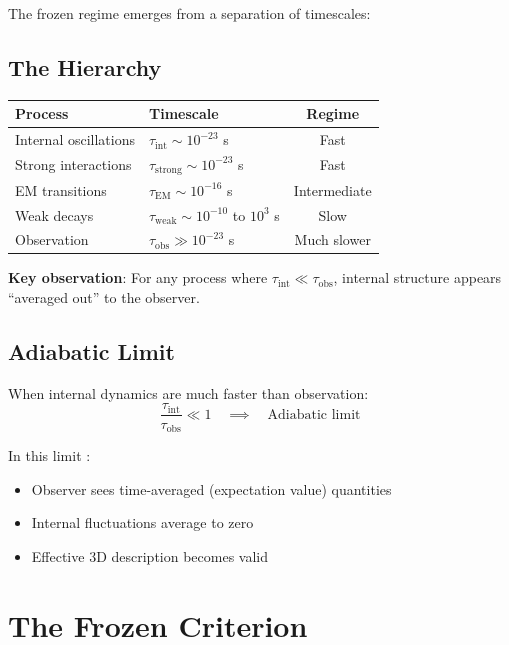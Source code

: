The frozen regime emerges from a separation of timescales:

\subsection{The Hierarchy}

\begin{center}
\begin{tabular}{llc}
\toprule
\textbf{Process} & \textbf{Timescale} & \textbf{Regime} \\
\midrule
Internal oscillations & $\tau_{\text{int}} \sim 10^{-23}$ s & Fast \\
Strong interactions & $\tau_{\text{strong}} \sim 10^{-23}$ s & Fast \\
EM transitions & $\tau_{\text{EM}} \sim 10^{-16}$ s & Intermediate \\
Weak decays & $\tau_{\text{weak}} \sim 10^{-10}$ to $10^3$ s & Slow \\
Observation & $\tau_{\text{obs}} \gg 10^{-23}$ s & Much slower \\
\bottomrule
\end{tabular}
\end{center}

\textbf{Key observation}: For any process where $\tau_{\text{int}} \ll \tau_{\text{obs}}$,
internal structure appears ``averaged out'' to the observer.

\subsection{Adiabatic Limit}

When internal dynamics are much faster than observation:
\begin{equation}
\frac{\tau_{\text{int}}}{\tau_{\text{obs}}} \ll 1 \quad \implies \quad \text{Adiabatic limit}
\end{equation}

In this limit \tagDc{}:
\begin{itemize}[nosep]
\item Observer sees time-averaged (expectation value) quantities
\item Internal fluctuations average to zero
\item Effective 3D description becomes valid
\end{itemize}

\section{The Frozen Criterion}
\label{sec:frozen_criterion}

